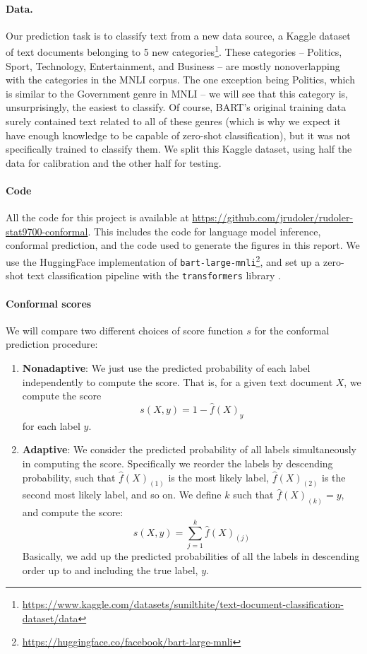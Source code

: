 \documentclass[a4paper, 12pt]{article}
\begin{document}
\paragraph*{Data.} Our prediction task is to classify text from a new data source, a Kaggle dataset of text documents belonging to 5 new categories\footnote{\url{https://www.kaggle.com/datasets/sunilthite/text-document-classification-dataset/data}}. These categories -- Politics, Sport, Technology, Entertainment, and Business -- are mostly nonoverlapping with the categories in the MNLI corpus. The one exception being Politics, which is similar to the Government genre in MNLI -- we will see that this category is, unsurprisingly, the easiest to classify. Of course, BART's original training data surely contained text related to all of these genres (which is why we expect it have enough knowledge to be capable of zero-shot classification), but it was not specifically trained to classify them. We split this Kaggle dataset, using half the data for calibration and the other half for testing.

\paragraph*{Code} All the code for this project is available at \url{https://github.com/jrudoler/rudoler-stat9700-conformal}. This includes the code for language model inference, conformal prediction, and the code used to generate the figures in this report. We use the HuggingFace implementation of \texttt{bart-large-mnli}\footnote{\url{https://huggingface.co/facebook/bart-large-mnli}}, and set up a zero-shot text classification pipeline with the \texttt{transformers} library \autocite{wolfHuggingFaceTransformersStateoftheart2019}.

\paragraph{Conformal scores}
We will compare two different choices of score function $s$ for the conformal prediction procedure:
\begin{enumerate}
    \item \textbf{Nonadaptive}: We just use the predicted probability of each label independently to compute the score. That is, for a given text document $X$, we compute the score \[s(X, y) = 1 - \hat{f}(X)_y \] for each label $y$.
    \item \textbf{Adaptive}: We consider the predicted probability of all labels simultaneously in computing the score. Specifically we reorder the labels by descending probability, such that $\hat{f}(X)_{(1)}$ is the most likely label, $\hat{f}(X)_{(2)}$ is the second most likely label, and so on. We define $k$ such that $\hat{f}(X)_{(k)} = y$, and compute the score: \[ s(X, y) = \sum_{j=1}^{k} \hat{f}(X)_{(j)} \] Basically, we add up the predicted probabilities of all the labels in descending order up to and including the true label, $y$.
\end{enumerate}
\end{document}
